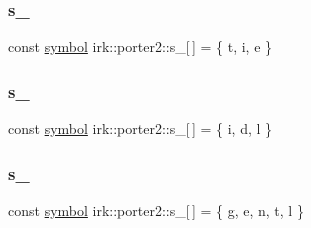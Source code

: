 \mbox{\label{namespaceirk_1_1porter2_af9b121a93506b6a820293315a8d6e7ea}} 
\subsubsection{\texorpdfstring{s\+\_}{s\_32}}
{\footnotesize\ttfamily const \mbox{\hyperlink{namespaceirk_1_1porter2_afd04c4eb58a1dabcf8f3ab2d7e9f9ed5}{symbol}} irk\+::porter2\+::s\+\_\mbox{[}$\,$\mbox{]} = \{ \textquotesingle{}t\textquotesingle{}, \textquotesingle{}i\textquotesingle{}, \textquotesingle{}e\textquotesingle{} \}\hspace{0.3cm}{\ttfamily [static]}}

\mbox{\label{namespaceirk_1_1porter2_a157c0e9a9dfcb2575006b9bc490864f6}} 
\subsubsection{\texorpdfstring{s\+\_}{s\_33}}
{\footnotesize\ttfamily const \mbox{\hyperlink{namespaceirk_1_1porter2_afd04c4eb58a1dabcf8f3ab2d7e9f9ed5}{symbol}} irk\+::porter2\+::s\+\_\mbox{[}$\,$\mbox{]} = \{ \textquotesingle{}i\textquotesingle{}, \textquotesingle{}d\textquotesingle{}, \textquotesingle{}l\textquotesingle{} \}\hspace{0.3cm}{\ttfamily [static]}}

\mbox{\label{namespaceirk_1_1porter2_a1540baa678177d325c3920b07a28b85d}} 
\subsubsection{\texorpdfstring{s\+\_}{s\_34}}
{\footnotesize\ttfamily const \mbox{\hyperlink{namespaceirk_1_1porter2_afd04c4eb58a1dabcf8f3ab2d7e9f9ed5}{symbol}} irk\+::porter2\+::s\+\_\mbox{[}$\,$\mbox{]} = \{ \textquotesingle{}g\textquotesingle{}, \textquotesingle{}e\textquotesingle{}, \textquotesingle{}n\textquotesingle{}, \textquotesingle{}t\textquotesingle{}, \textquotesingle{}l\textquotesingle{} \}\hspace{0.3cm}{\ttfamily [static]}}

